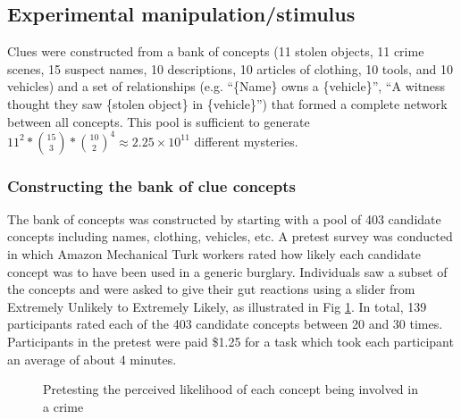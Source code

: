 \documentclass{article}
\begin{document}
\subsection{Experimental manipulation/stimulus}
\label{manipulation}
Clues were constructed from a bank of concepts (11 stolen objects, 11 crime scenes, 15 suspect names, 10 descriptions, 10 articles of clothing, 10 tools, and 10 vehicles) and a set of relationships (e.g. ``\{Name\} owns a \{vehicle\}'', ``A witness thought they saw \{stolen object\} in \{vehicle\}'') that formed a complete network between all concepts. This pool is sufficient to generate $11^2 * {15 \choose 3} * {10 \choose 2}^4 \approx 2.25\times10^{11}$ different mysteries.

\subsubsection{Constructing the bank of clue concepts}
The bank of concepts was constructed by starting with a pool of 403 candidate concepts including names, clothing, vehicles, etc. A pretest survey was conducted in which Amazon Mechanical Turk workers rated how likely each candidate concept was to have been used in a generic burglary. Individuals saw a subset of the concepts and were asked to give their gut reactions using a slider from Extremely Unlikely to Extremely Likely, as illustrated in Fig \ref{fig:clue_pretest}. In total, 139 participants rated each of the 403 candidate concepts between 20 and 30 times. Participants in the pretest were paid \$1.25 for a task which took each participant an average of about 4 minutes.

\begin{figure}[h!]
\centering
{}
\caption{Pretesting the perceived likelihood of each concept being involved in a crime}
\label{fig:clue_pretest}
\end{figure}
\end{document}
